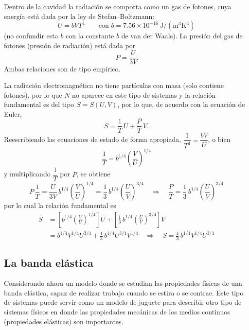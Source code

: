 Dentro de la cavidad la radiación se comporta como un gas de fotones, cuya energía está dada por la
ley de Stefan--Boltzmann:
\begin{equation*}
  \boxed{U=bVT^{4}}\qquad\text{con }b=7.56\times10^{-16}\ \mathrm{J/(m^{3}K^{4})}
\end{equation*}
(no confundir esta $b$ con la constante $b$ de van der Waals). La presión del gas de fotones
(presión de radiación) está dada por
\begin{equation*}
  \boxed{P=\frac{U}{3V}}
\end{equation*}
Ambas relaciones son de tipo empírico.

La radiación electromagnética no tiene partículas con masa (solo contiene fotones), por lo que $N$
no aparece en este tipo de sistemas y la relación fundamental es del tipo $S=S(U,V)$, por lo que, de
acuerdo con la ecuación de Euler,
\begin{equation*}
  S=\frac{1}{T}\,U+\frac{P}{T}\,V.
\end{equation*}
Reescribiendo las ecuaciones de estado de forma apropiada,
$\dfrac{1}{T^{4}}=\dfrac{bV}{U}$, o bien
\begin{equation*}
  \boxed{\frac{1}{T}=b^{1/4}\left(\frac{V}{U}\right)^{1/4}}
\end{equation*}
y multiplicando $\dfrac{1}{T}$ por $P$, se obtiene
\begin{equation*}
  P\,\frac{1}{T}=\frac{U}{3V}\,b^{1/4}\left(\frac{V}{U}\right)^{1/4}=\frac{1}{3}\,b^{1/4}\left(\frac{U}{V}\right)^{3/4}
  \quad\Longrightarrow\quad
  \boxed{\frac{P}{T}=\frac{1}{3}\,b^{1/4}\left(\frac{U}{V}\right)^{3/4}}
\end{equation*}
por lo cual la relación fundamental es
\begin{align*}
  S&=\left[b^{1/4}\left(\frac{V}{U}\right)^{1/4}\right]U+\left[\frac{1}{3}\,b^{1/4}\left(\frac{U}{V}\right)^{3/4}\right]V\\
   &=b^{1/4}V^{1/4}U^{3/4}+\frac{1}{3}\,b^{1/4}U^{3/4}V^{1/4}
   \quad\Longrightarrow\quad
   \boxed{S=\frac{4}{3}\,b^{1/4}V^{1/4}U^{3/4}}
\end{align*}

\subsection*{La banda elástica}

Considerando ahora un modelo donde se estudian las propiedades físicas de una banda elástica, capaz
de realizar trabajo
cuando se estira o se contrae. Este tipo de sistemas puede servir como un modelo de juguete para
describir otro tipo de sistemas físicos en donde las propiedades mecánicas de los medios continuos
(propiedades elásticas) son importantes.

